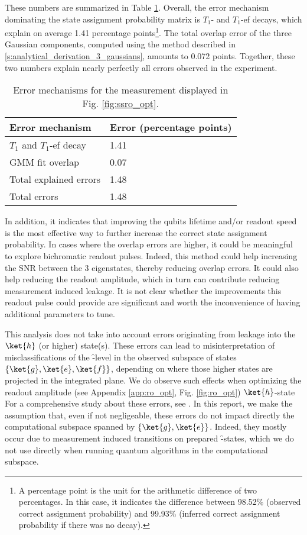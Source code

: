 These numbers are summarized in Table \ref{tab:error_mechanisms}. Overall, the error mechanism dominating the state assignment probability matrix is $T_1$- and $T_1$-ef decays, which explain on average 1.41 percentage points\footnote{A percentage point is the unit for the arithmetic difference of two percentages. In this case, it indicates the difference between 98.52\% (observed correct assignment probability)  and 99.93\% (inferred correct assignment probability if there was no decay).}. The total overlap error of the three Gaussian components, computed using the method described in  \ref{s:analytical_derivation_3_gaussians}, amounts to 0.072 points. Together, these two numbers explain nearly perfectly all errors observed in the experiment. 

\begin{table}[ht]
\centering
\caption{Error mechanisms for the measurement displayed in Fig. \ref{fig:ssro_opt}.}
\begin{tabularx}{0.6\textwidth}{ll}
\toprule 
\textbf{Error mechanism} & \textbf{Error (percentage points)} \\
\midrule
    $T_1$ and $T_1$-ef decay & 1.41 \\
    GMM fit overlap & 0.07\\
    \midrule
    Total explained errors & 1.48  \\
    \midrule
    Total errors & 1.48 \\
\bottomrule
\end{tabularx}

\label{tab:error_mechanisms}
\end{table}

In addition, it indicates that improving the qubits lifetime and/or readout speed is the most effective way to further increase the correct state assignment probability. In cases where the overlap errors are higher, it could be meaningful to explore  bichromatic readout pulses. Indeed, this method could help increasing the SNR between the 3 eigenstates, thereby reducing overlap errors. It could also help reducing the readout amplitude, which in turn can contribute reducing measurement induced leakage. It is not clear whether the improvements this readout pulse could provide are significant and worth the inconvenience of having additional parameters to tune.

This analysis does not take into account errors originating from leakage into the $\ket{h}$ (or higher) state(s). These errors can lead to misinterpretation of misclassifications of the \f-level in the observed subspace of states $\{\ket{g}, \ket{e}, \ket{f}\}$, depending on where those higher states are projected in the integrated plane. We do observe such effects when optimizing the readout amplitude (see Appendix \ref{app:ro_opt}, Fig. \ref{fig:ro_opt}) $\ket{h}$-state For a comprehensive study about these errors, see \cite{Sank2016Measurement-InducedApproximation, ElderHigh-fidelityCircuits}. In this report, we make the assumption that, even if not negligeable, these errors do not impact directly the computational subspace spanned by $\{\ket{g}, \ket{e}\}$. Indeed, they mostly occur due to measurement induced transitions on prepared \f-states, which we do not use directly when running quantum algorithms in the computational subspace. 

